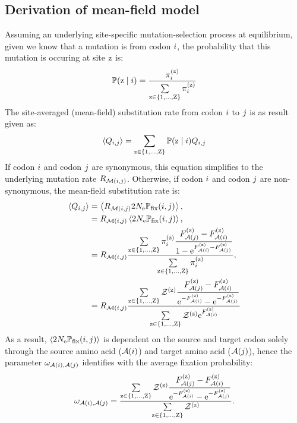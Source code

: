 \subsection{Derivation of mean-field model}
\label{subsec:mean-field-derivation}
Assuming an underlying site-specific mutation-selection process at equilibrium, given we know that a mutation is from codon ${i}$, the probability that this mutation is occuring at site $\text{z}$ is:
\begin{align}
    \mathbb{P} (\text{z} \mid {i}) = \dfrac{ \pi_{{i}}^{(\text{z})} }{\sum\limits_{\text{z} \in \{1, \hdots, \text{Z}\}} \pi_{{i}}^{(\text{z})} }
\end{align}
The site-averaged (mean-field) substitution rate from codon ${i}$ to ${j}$ is as result given as:
\begin{align}
    \left\langle Q_{{i}, {j}} \right\rangle = \sum\limits_{\text{z} \in \{1, \hdots, \text{Z}\}} \mathbb{P} (\text{z} \mid {i}) Q_{{i}, {j}}
\end{align}
If codon ${i}$ and codon ${j}$ are synonymous, this equation simplifies to the underlying mutation rate $R_{\mathcal{M}({i}, {j})}$.
Otherwise, if codon ${i}$ and codon ${j}$ are non-synonymous, the mean-field substitution rate is:
\begin{align}
    \left\langle Q_{{i}, {j}} \right\rangle & = \left\langle R_{\mathcal{M}({i}, {j})} 2 N_{\text{e}} \mathbb{P}_{\text{fix}} ({i}, {j}) \right\rangle, \\
    & = R_{\mathcal{M}({i}, {j})} \left\langle 2 N_{\text{e}} \mathbb{P}_{\text{fix}} ({i}, {j}) \right\rangle, \\
    & = R_{\mathcal{M}({i}, {j})} \dfrac{ \sum\limits_{\text{z} \in \{1, \hdots, \text{Z}\}} \pi_{{i}}^{(\text{z})} \dfrac{F_{\mathcal{A}({j})}^{(\text{z})} - F_{\mathcal{A}({i})}^{(\text{z})}}{1 - \text{e}^{F_{\mathcal{A}({i})}^{(\text{z})} - F_{\mathcal{A}({j})}^{(\text{z})}}} }{ \sum\limits_{\text{z} \in \{1, \hdots, \text{Z}\}} \pi_{{i}}^{(\text{z})} }, \\
    & = R_{\mathcal{M}({i}, {j})} \dfrac{ \sum\limits_{\text{z} \in \{1, \hdots, \text{Z}\}} \mathcal{Z}^{(\text{z})}  \dfrac{F_{\mathcal{A}({j})}^{(\text{z})} - F_{\mathcal{A}({i})}^{(\text{z})}}{ \text{e}^{-F_{\mathcal{A}({i})}^{(\text{z})}} - \text{e}^{ - F_{\mathcal{A}({j})}^{(\text{z})}}} }{  \sum\limits_{\text{z} \in \{1, \hdots, \text{Z}\}} \mathcal{Z}^{(\text{z})} \text{e}^{F_{\mathcal{A}({i})}^{(\text{z})}} }
\end{align}
As a result, $\left\langle 2 N_{\text{e}} \mathbb{P}_{\text{fix}} ({i}, {j}) \right\rangle$ is dependent on the source and target codon solely through the source amino acid ($\mathcal{A}({i})$) and target amino acid ($\mathcal{A}({j})$), hence the parameter $\omega_{\mathcal{A}({i}), \mathcal{A}({j})}$ identifies with the average fixation probability:
\begin{equation}
    \omega_{\mathcal{A}({i}), \mathcal{A}({j})} = \dfrac{ \sum\limits_{\text{z} \in \{1, \hdots, \text{Z}\}} \mathcal{Z}^{(\text{z})}  \dfrac{F_{\mathcal{A}({j})}^{(\text{z})} - F_{\mathcal{A}({i})}^{(\text{z})}}{ \text{e}^{-F_{\mathcal{A}({i})}^{(\text{z})}} - \text{e}^{ - F_{\mathcal{A}({j})}^{(\text{z})}}} }{  \sum\limits_{\text{z} \in \{1, \hdots, \text{Z}\}} \mathcal{Z}^{(\text{z})}  }.
\end{equation}

